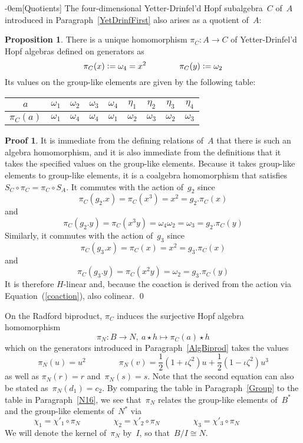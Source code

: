 \documentclass{article}
\makeatletter
\renewcommand{\subsection}{\@startsection{subsection}{2}{0em}%
{\baselineskip}{-0em}{\bfseries\normalsize}}
\numberwithin{equation}{section}
\theoremstyle{definition}
\newtheorem*{prop}{Proposition}
\newtheorem*{pf}{Proof}
\theoremstyle{break}
\newcommand{\deq}{\vcentcolon =}
\newcommand{\K}{1}
\newcommand{\1}{{(1)}}
\newcommand{\2}{{(2)}}
\newcommand{\3}{{(3)}}
\newcommand{\sa}{S_{A}}
\newcommand{\sd}{S_{C}}
\makeatother
\begin{document}
\subsection[Quotients]{} \label{YDQ}
The four-dimensional Yetter-Drinfel'd Hopf subalgebra~$C$ of~$A$ introduced in Paragraph~\ref{YetDrinfFirst} also arises as a quotient of~$A$:
\begin{prop}
There is a unique homomorphism $\pi_C \colon A \to C$ of Yetter-Drinfel'd Hopf algebras defined on generators as
\[\pi_C(x) \deq \omega_4 = x^2 \qquad \qquad \pi_C(y) \deq \omega_2 \]
Its values on the group-like elements are given by the following table:
\begin{center}
\renewcommand\arraystretch{1.5}
\begin{tabular}{|c|c|c|c|c|c|c|c|c|} \hline
$a$ & $\omega_1$ & $\omega_2$ & $\omega_3$ & $\omega_4$
& $\eta_1$ & $\eta_2$ & $\eta_3$ & $\eta_4$\\ \hline
$\pi_C(a)$ & $\omega_1$ & $\omega_4$ & $\omega_4$ & $\omega_1$
& $\omega_2$ & $\omega_3$ & $\omega_2$ & $\omega_3$\\ \hline
\end{tabular}
\end{center}
\end{prop}
\begin{pf}
It is immediate from the defining relations of~$A$ that there is such an algebra homomorphism, and it is also immediate from the definitions that it takes the specified values on the group-like elements. Because it takes group-like elements to group-like elements, it is a coalgebra homomorphism that satisfies~$\sd \circ \pi_C = \pi_C \circ \sa$. It commutes with the action of~$g_2$ since
\[\pi_C(g_2.x) = \pi_C(x^3) = x^2 = g_2.\pi_C(x)\]
and
\[\pi_C(g_2.y) = \pi_C(x^3 y) = \omega_4 \omega_2 = \omega_3 = g_2.\pi_C(y)\]
Similarly, it commutes with the action of~$g_3$ since
\[\pi_C(g_3.x) = \pi_C(x) = x^2 = g_3.\pi_C(x)\]
and
\[\pi_C(g_3.y) = \pi_C(x^2 y) = \omega_2 = g_3.\pi_C(y)\]
It is therefore $H$-linear and, because the coaction is derived from the action via Equation~(\ref{coaction}), also colinear.
\qed
\end{pf}

On the Radford biproduct, $\pi_C$ induces the surjective Hopf algebra homomorphism
\[\pi_N \colon B \to N,~a \star h \mapsto \pi_C(a) \star h \]
which on the generators introduced in Paragraph~\ref{AlgBiprod} takes the values
\[\pi_N(u) = u^2 \qquad \qquad
\pi_N(v) = \frac{\K}{2}(1 + \iota \zeta^2) u + \frac{\K}{2}(1 - \iota \zeta^2) u^3  \]
as well as $\pi_N(r) = r$ and~$\pi_N(s) = s$. Note that the second equation can also be stated as~$\pi_N(d_1) = c_2$. By comparing the table in Paragraph~\ref{Group} to the table in Paragraph~\ref{N16}, we see that~$\pi_N$ relates the group-like elements of~$B^*$ and the group-like elements of~$N^*$ via
\[\chi_1 = \chi'_1 \circ \pi_N \qquad  \qquad \chi_2 = \chi'_2 \circ \pi_N \qquad \qquad
\chi_3 = \chi'_3 \circ \pi_N \qquad \qquad\]
We will denote the kernel of~$\pi_N$ by~$I$, so that~$B/I \cong N$.
\end{document}
